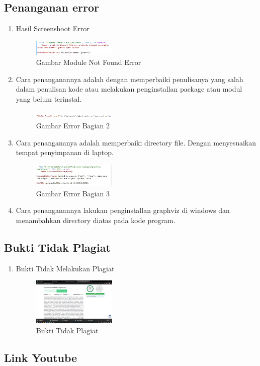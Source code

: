 \subsection{Penanganan error}
\begin{enumerate}
\item Hasil Screenshoot Error
\begin{figure}[H]
	\includegraphics[width=4cm]{figures/1174062/2/Error/1.png}
	\centering
	\caption{Gambar Module Not Found Error }
\end{figure}
\item Cara penanganannya adalah dengan memperbaiki penulisanya yang salah dalam penulisan kode atau melakukan penginstallan package atau modul yang belum terinstal.\\

\begin{figure}[H]
\includegraphics[width=4cm]{figures/1174062/2/Error/2.png}
	\centering
	\caption{Gambar Error Bagian 2 }
\end{figure}
\item Cara penangananya adalah memperbaiki directory file. Dengan menyesuaikan tempat penyimpanan di laptop.\\

\begin{figure}[H]
\includegraphics[width=4cm]{figures/1174062/2/Error/3.png}
	\centering
	\caption{Gambar Error Bagian 3 }
\end{figure}
\item Cara penanganannya lakukan penginstallan graphviz di windows dan menambahkan directory diatas pada kode program.

\end{enumerate}


\subsection{Bukti Tidak Plagiat}
\begin{enumerate}
\item Bukti Tidak Melakukan Plagiat
\begin{figure}[H]
\includegraphics[width=4cm]{figures/1174062/2/Plagiat/Tidakplagiat.png}
	\centering
	\caption{Bukti Tidak Plagiat }
\end{figure}
\end{enumerate}

\subsection{Link Youtube}


